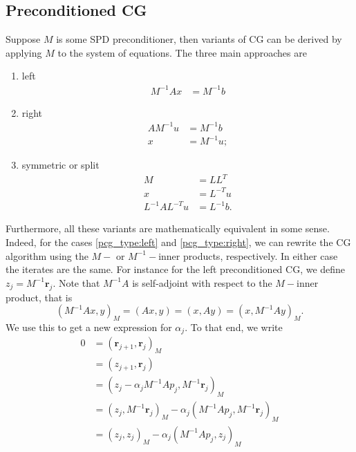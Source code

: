 \subsection{Preconditioned CG} \label{sec:cg_preconditioning}
Suppose $M$ is some SPD preconditioner, then variants of CG can be derived by applying $M$ to the system of equations. The three main approaches are
\begin{enumerate}[label=\roman*,ref=preconditioner-type \roman*]
  \item\label{pcg_type:left} left
  \begin{align*}
    M^{-1}Ax & = M^{-1}b
  \end{align*}
  \item\label{pcg_type:right} right
  \begin{align*}
    AM^{-1}u & = M^{-1}b  \\
    x        & = M^{-1}u;
  \end{align*}
  \item\label{pcg_type:symmetric} symmetric or split
  \begin{align*}
    M              & = LL^T     \\
    x              & = L^{-T}u  \\
    L^{-1}AL^{-T}u & = L^{-1}b.
  \end{align*}
\end{enumerate}
Furthermore, all these variants are mathematically equivalent in some sense. Indeed, for the cases \cref{pcg_type:left} and \cref{pcg_type:right}, we can rewrite the CG algorithm using the $M-$ or $M^{-1}-$inner products, respectively. In either case the iterates are the same. For instance for the left preconditioned CG, we define $z_j = M^{-1}\mathbf{r}_j$. Note that $M^{-1}A$ is self-adjoint with respect to the $M-$inner product, that is
\[
  (M^{-1}Ax, y)_M = (Ax, y) = (x, Ay) = (x, M^{-1}Ay)_M.
\]
We use this to get a new expression for $\alpha_j$. To that end, we write
\begin{align*}
  0 & = (\mathbf{r}_{j+1}, \mathbf{r}_j)_M                                        \\
    & = (z_{j+1}, \mathbf{r}_j)                                                   \\
    & = (z_j - \alpha_j M^{-1}Ap_j, M^{-1}\mathbf{r}_j)_M                         \\
    & = (z_j, M^{-1}\mathbf{r}_j)_M - \alpha_j (M^{-1}Ap_j, M^{-1}\mathbf{r}_j)_M \\
    & = (z_j, z_j)_M - \alpha_j (M^{-1}Ap_j, z_j)_M                               \\
\end{align*}

